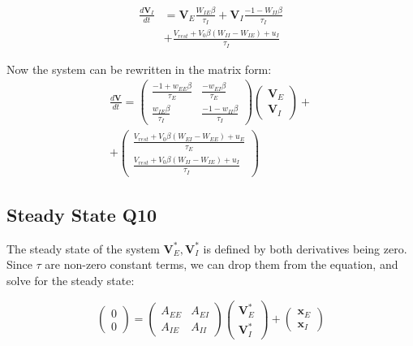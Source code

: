 \documentclass[10pt,twocolumn]{article}
\begin{document}
$$
    \begin{align*}
        \frac{d\textbf{V}_I}{dt} &= \textbf{V}_E\boxed{\frac{W_{IE}\beta}{\tau_I}}
        + \textbf{V}_I\boxed{\frac{-1 - W_{II}\beta}{\tau_I}} \\
        &+ \boxed{\frac{V_{rest} + V_0\beta(W_{II}-W_{IE}) + u_I}{\tau_I}}
    \end{align*}
$$

Now the system can be rewritten in the matrix form:
$$
    \begin{align*}
        \frac{d\textbf{V}}{dt}
        =
        \begin{pmatrix}
            \frac{-1 + w_{EE}\beta}{\tau_E} & \frac{-w_{EI}\beta}{\tau_E}     \\
            \frac{w_{IE}\beta}{\tau_I}      & \frac{-1 - w_{II}\beta}{\tau_I}
        \end{pmatrix}
        \begin{pmatrix}
            \textbf{V}_E \\ \textbf{V}_I
        \end{pmatrix}+
        \\
        +
        \begin{pmatrix}
            \frac{V_{rest} + V_0\beta(W_{EI}-W_{EE}) + u_E}{\tau_E} \\
            \frac{V_{rest} + V_0\beta(W_{II}-W_{IE}) + u_I}{\tau_I}
        \end{pmatrix}
    \end{align*}
$$


\subsection{Steady State Q10}
The steady state of the system $\textbf{V}^\ast_E,\textbf{V}^\ast_I$ is defined  by
both derivatives being zero. Since $\tau$ are non-zero constant terms, we can drop
them from the equation, and solve for the steady state:

$$
    \begin{pmatrix}
        0 \\ 0
    \end{pmatrix}
    =
    \begin{pmatrix}
        A_{EE} & A_{EI} \\
        A_{IE} & A_{II}
    \end{pmatrix}
    \begin{pmatrix}
        \textbf{V}^\ast_E \\ \textbf{V}^\ast_I
    \end{pmatrix}+
    \begin{pmatrix}
        \textbf{x}_E \\ \textbf{x}_I
    \end{pmatrix}
$$
\end{document}
